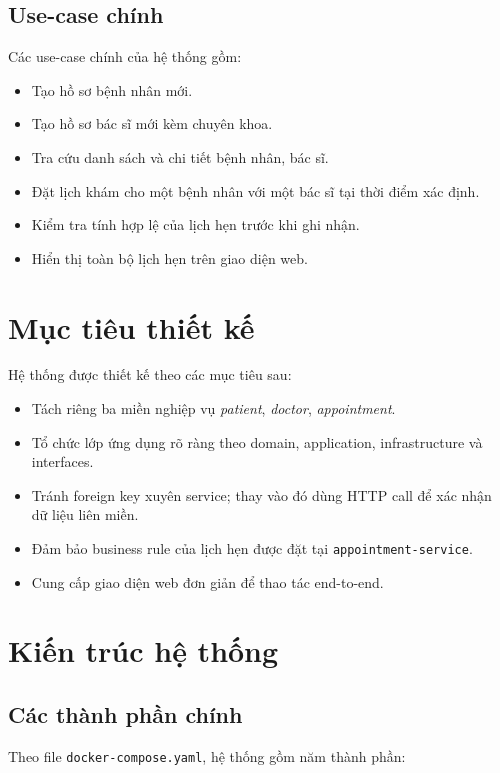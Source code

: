 \documentclass[12pt,a4paper]{article}
\begin{document}
\subsection{Use-case chính}
Các use-case chính của hệ thống gồm:
\begin{itemize}[leftmargin=1.5em]
  \item Tạo hồ sơ bệnh nhân mới.
  \item Tạo hồ sơ bác sĩ mới kèm chuyên khoa.
  \item Tra cứu danh sách và chi tiết bệnh nhân, bác sĩ.
  \item Đặt lịch khám cho một bệnh nhân với một bác sĩ tại thời điểm xác định.
  \item Kiểm tra tính hợp lệ của lịch hẹn trước khi ghi nhận.
  \item Hiển thị toàn bộ lịch hẹn trên giao diện web.
\end{itemize}

\section{Mục tiêu thiết kế}
Hệ thống được thiết kế theo các mục tiêu sau:
\begin{itemize}[leftmargin=1.5em]
  \item Tách riêng ba miền nghiệp vụ \textit{patient}, \textit{doctor}, \textit{appointment}.
  \item Tổ chức lớp ứng dụng rõ ràng theo domain, application, infrastructure và interfaces.
  \item Tránh foreign key xuyên service; thay vào đó dùng HTTP call để xác nhận dữ liệu liên miền.
  \item Đảm bảo business rule của lịch hẹn được đặt tại \texttt{appointment-service}.
  \item Cung cấp giao diện web đơn giản để thao tác end-to-end.
\end{itemize}

\section{Kiến trúc hệ thống}
\subsection{Các thành phần chính}
Theo file \texttt{docker-compose.yaml}, hệ thống gồm năm thành phần:
\end{document}
